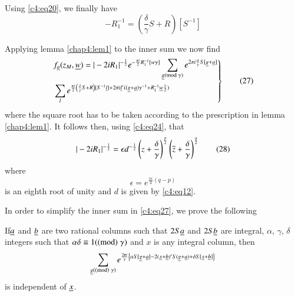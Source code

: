 Using \eqref{c4:eq20}, we finally have
\begin{equation*}
-R^{-1}_{1}=\left(\frac{\delta}{\gamma}S+R\right)[S^{-1}]\tag{26}\label{c4:eq26}
\end{equation*}

Applying lemma \ref{chap4:lem1} to the inner sum we now find
\begin{equation*}
\left.
\begin{aligned}
& f_{\underline{a}}(z_{M},\underline{w})=|-2iR_{1}|^{-\frac{1}{2}}e^{-\frac{\pi i}{2}R^{-1}_{1}[w\gamma]}\sum_{\underline{g}(\rm{mod} \; \gamma)}e^{2\pi i\frac{\alpha}{\gamma}S[\underline{g}+\underline{a}]}\\
& \sum_{l}e^{\frac{\pi i}{2}\left(\frac{\delta}{\gamma}S+R\right)[S^{-1}\underline{l}]+2\pi i\underline{l}'((\underline{g}+\underline{a})\gamma^{-1}+R^{-1}_{1}\underline{w}\frac{\gamma}{2})}
\end{aligned}
\right\}\tag{27}\label{c4:eq27}
\end{equation*}
where the square root has to be taken according to the prescription in
lemma \ref{chap4:lem1}. It follows then, using \eqref{c4:eq24}, that
\begin{equation*}
|-2iR_{1}|^{-\frac{1}{2}}=\epsilon d^{-\frac{1}{2}}\left(z+\frac{\delta}{\gamma}\right)^{\frac{p}{2}}\left(\overline{z}+\frac{\delta}{\gamma}\right)^{\frac{q}{2}}\tag{28}\label{c4:eq28} 
\end{equation*}
where
\begin{equation*}
\epsilon=e^{\frac{\pi i}{4}(q-p)}\tag{29}\label{c4:eq29}
\end{equation*}
is an eighth root of unity and $d$ is given by \eqref{c4:eq12}.

In order to simplify the inner sum in \eqref{c4:eq27}, we prove the following 

\begin{lem}\label{chap4:lem2}
If\pageoriginale $\underline{a}$ and $\underline{b}$ are two rational columns such that $2S\underline{a}$ and $2S\underline{b}$ are integral, $\alpha$, $\gamma$, $\delta$ integers such that $\alpha\delta\equiv 1(\rm(mod) \; \gamma)$ and $x$ is any integral column, then
$$
\sum_{\underline{g}(\rm(mod) \; \gamma)}e^{\frac{2\pi i}{\gamma}\left\{\alpha S[\underline{g}+\underline{a}]-2(\underline{x}+\underline{b})'S(\underline{g}+\underline{a})+\delta S[\underline{x}+\underline{b}]\right\}} 
$$
is independent of $\underline{x}$.
\end{lem}

